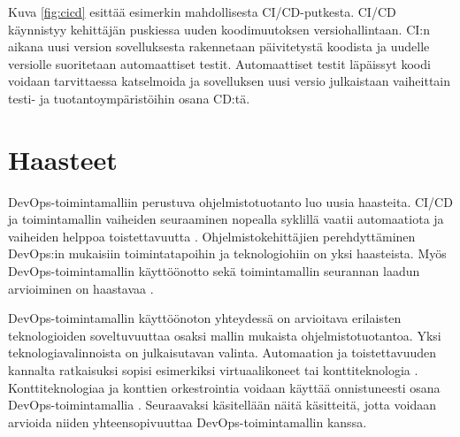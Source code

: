 Kuva \ref{fig:cicd} esittää esimerkin mahdollisesta CI/CD-putkesta. CI/CD käynnistyy kehittäjän puskiessa uuden koodimuutoksen versiohallintaan. CI:n aikana uusi version sovelluksesta rakennetaan päivitetystä koodista ja uudelle versiolle suoritetaan automaattiset testit. Automaattiset testit läpäissyt koodi voidaan tarvittaessa katselmoida ja sovelluksen uusi versio julkaistaan vaiheittain testi- ja tuotantoympäristöihin osana CD:tä.

\section{Haasteet}

DevOps-toimintamalliin perustuva ohjelmistotuotanto luo uusia haasteita.
CI/CD ja toimintamallin vaiheiden seuraaminen nopealla syklillä vaatii automaatiota ja vaiheiden helppoa toistettavuutta \cite{Jabbari16, Leite19}.
Ohjelmistokehittäjien perehdyttäminen DevOps:in mukaisiin toimintatapoihin ja teknologiohiin on yksi haasteista.
Myös DevOps-toimintamallin käyttöönotto sekä toimintamallin seurannan laadun arvioiminen on haastavaa \cite{Leite19}.

DevOps-toimintamallin käyttöönoton yhteydessä on arvioitava erilaisten teknologioiden soveltuvuuttaa osaksi mallin mukaista ohjelmistotuotantoa.
Yksi teknologiavalinnoista on julkaisutavan valinta.
Automaation ja toistettavuuden kannalta ratkaisuksi sopisi esimerkiksi virtuaalikoneet tai konttiteknologia \cite{Dua14}.
Konttiteknologiaa ja konttien orkestrointia voidaan käyttää onnistuneesti osana DevOps-toimintamallia \cite{Kang16}.
Seuraavaksi käsitellään näitä käsitteitä, jotta voidaan arvioida niiden yhteensopivuuttaa DevOps-toimintamallin kanssa.
